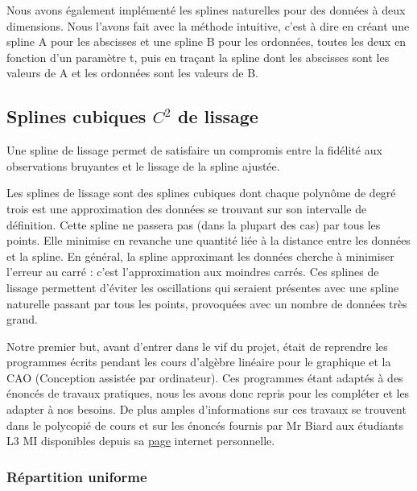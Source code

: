 \documentclass[a4paper,12pt]{article} %
\begin{document}
            Nous avons également implémenté les splines naturelles pour des données à deux dimensions. Nous l'avons fait avec la méthode intuitive, c'est à dire en créant une spline A pour les abscisses et une spline B pour les ordonnées, toutes les deux en fonction d'un paramètre t, puis en traçant la spline dont les abscisses sont les valeurs de A et les ordonnées sont les valeurs de B.
            
		\subsection{\label{partie_lissage}Splines cubiques $C^2$ de lissage}
		
		    Une spline de lissage permet de satisfaire un compromis entre la fidélité aux observations bruyantes et le lissage de la spline ajustée.
		
		    Les splines de lissage sont des splines cubiques dont chaque polynôme de degré trois est une approximation des données se trouvant sur son intervalle de définition. Cette spline ne passera pas (dans la plupart des cas)  par tous les points. Elle  minimise en revanche une quantité liée à la distance entre les données et la spline. En général, la spline approximant les données cherche à minimiser l'erreur au carré : c'est l'approximation aux moindres carrés.  Ces splines de lissage permettent d'éviter les oscillations qui seraient présentes avec une spline naturelle passant par tous les points, provoquées avec un nombre de données très grand. 
		    
		    Notre premier but, avant d'entrer dans le vif du projet, était de reprendre les programmes écrits pendant les cours d'algèbre linéaire pour le graphique et la CAO (Conception assistée par ordinateur). Ces programmes étant adaptés à des énoncés de travaux pratiques, nous les avons donc repris pour les compléter et les adapter à nos besoins.  De plus amples d'informations sur ces travaux se trouvent dans le polycopié de cours et sur les énoncés fournis par Mr Biard aux étudiants L3 MI disponibles depuis sa \href{http://www-ljk.imag.fr/membres/Luc.Biard}{page} internet personnelle.
	        

			\subsubsection{Répartition uniforme}
			
\end{document}
